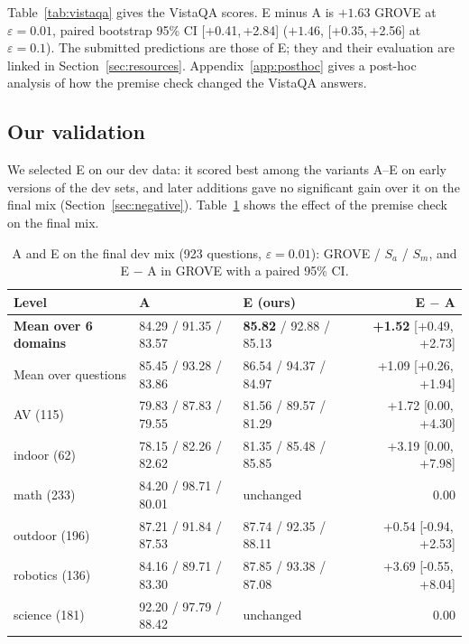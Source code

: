 \documentclass{article}
\newcommand{\ci}[2]{[#1,\,#2]}
\begin{document}
Table~\ref{tab:vistaqa} gives the VistaQA scores.
E minus A is $+1.63$ GROVE at $\varepsilon=0.01$, paired bootstrap 95\% CI \ci{+0.41}{+2.84}
($+1.46$, \ci{+0.35}{+2.56} at $\varepsilon=0.1$).
The submitted predictions are those of E; they and their evaluation are linked in Section~\ref{sec:resources}.
Appendix~\ref{app:posthoc} gives a post-hoc analysis of how the premise check changed the VistaQA answers.

\subsection{Our validation}
\label{sec:validation}

We selected E on our dev data: it scored best among the variants A--E on early versions of the dev sets,
and later additions gave no significant gain over it on the final mix (Section~\ref{sec:negative}).
Table~\ref{tab:validation} shows the effect of the premise check on the final mix.

\begin{table}[t]
  \caption{A and E on the final dev mix (923 questions, $\varepsilon=0.01$): GROVE / $S_a$ / $S_m$, and E $-$ A in GROVE with a paired 95\% CI.}
  \label{tab:validation}
  \centering
  \footnotesize
  \begin{tabular}{lllr}
    \toprule
    Level & A & E (ours) & E $-$ A \\
    \midrule
    \textbf{Mean over 6 domains} & 84.29 / 91.35 / 83.57 & \textbf{85.82} / 92.88 / 85.13 & \textbf{+1.52} \ci{+0.49}{+2.73} \\
    Mean over questions & 85.45 / 93.28 / 83.86 & 86.54 / 94.37 / 84.97 & +1.09 \ci{+0.26}{+1.94} \\
    \midrule
    AV (115) & 79.83 / 87.83 / 79.55 & 81.56 / 89.57 / 81.29 & +1.72 \ci{0.00}{+4.30} \\
    indoor (62) & 78.15 / 82.26 / 82.62 & 81.35 / 85.48 / 85.85 & +3.19 \ci{0.00}{+7.98} \\
    math (233) & 84.20 / 98.71 / 80.01 & unchanged & 0.00 \\
    outdoor (196) & 87.21 / 91.84 / 87.53 & 87.74 / 92.35 / 88.11 & +0.54 \ci{-0.94}{+2.53} \\
    robotics (136) & 84.16 / 89.71 / 83.30 & 87.85 / 93.38 / 87.08 & +3.69 \ci{-0.55}{+8.04} \\
    science (181) & 92.20 / 97.79 / 88.42 & unchanged & 0.00 \\
    \bottomrule
  \end{tabular}
\end{table}
\end{document}
